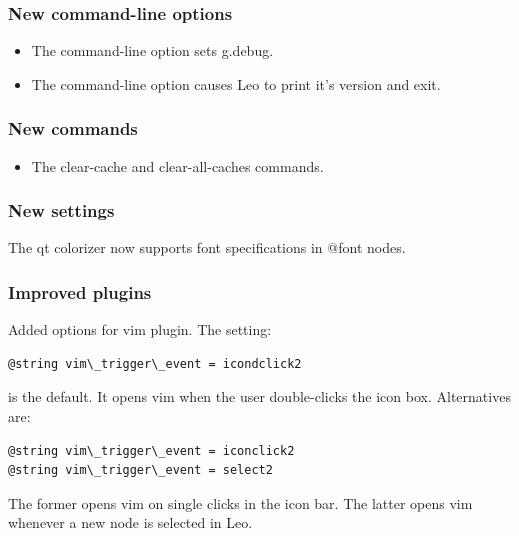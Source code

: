 \documentclass[a4paper,10pt,english]{sphinxmanual}
\begin{document}
\subsubsection{New command-line options}
\label{what-is-new:new-command-line-options}\begin{itemize}
\item {} 
The  command-line option sets g.debug.

\item {} 
The  command-line option causes Leo
to print it's version and exit.

\end{itemize}


\subsubsection{New commands}
\label{what-is-new:id3}\begin{itemize}
\item {} 
The clear-cache and clear-all-caches commands.

\end{itemize}


\subsubsection{New settings}
\label{what-is-new:new-settings}
The qt colorizer now supports font specifications in @font nodes.


\subsubsection{Improved plugins}
\label{what-is-new:improved-plugins}
Added options for vim plugin. The setting:

\begin{Verbatim}[commandchars=\\\{\}]
@string vim\_trigger\_event = icondclick2
\end{Verbatim}

is the default. It opens vim when the user double-clicks the icon box.
Alternatives are:

\begin{Verbatim}[commandchars=\\\{\}]
@string vim\_trigger\_event = iconclick2
@string vim\_trigger\_event = select2
\end{Verbatim}

The former opens vim on single clicks in the icon bar.
The latter opens vim whenever a new node is selected in Leo.
\end{document}
